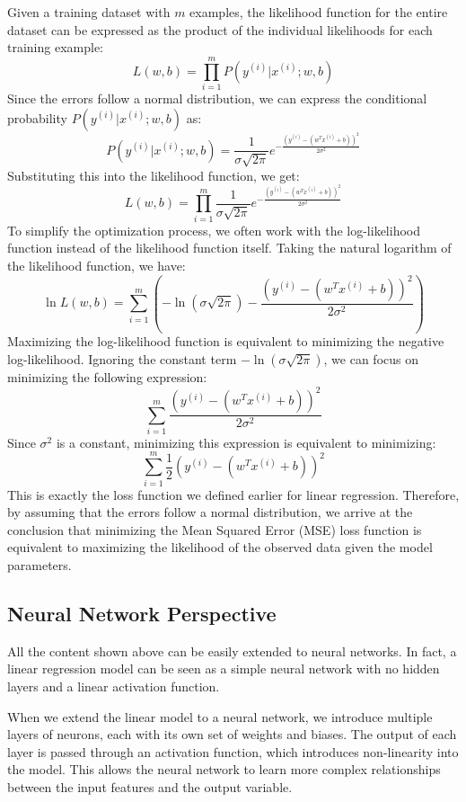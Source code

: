Given a training dataset with \(m\) examples, the likelihood function for the entire dataset can be expressed as the product of the individual likelihoods for each training example:
\[
L(w, b) = \prod_{i=1}^{m} P(y^{(i)} | x^{(i)}; w, b)
\]
Since the errors follow a normal distribution, we can express the conditional probability \(P(y^{(i)} | x^{(i)}; w, b)\) as:
\[
P(y^{(i)} | x^{(i)}; w, b) = \frac{1}{\sigma \sqrt{2\pi}} e^{-\frac{(y^{(i)} - (w^T x^{(i)} + b))^2}{2\sigma^2}}
\]
Substituting this into the likelihood function, we get:
\[
L(w, b) = \prod_{i=1}^{m} \frac{1}{\sigma \sqrt{2\pi}} e^{-\frac{(y^{(i)} - (w^T x^{(i)} + b))^2}{2\sigma^2}}
\]
To simplify the optimization process, we often work with the log-likelihood function instead of the likelihood function itself. Taking the natural logarithm of the likelihood function, we have:
\[
\ln L(w, b) = \sum_{i=1}^{m} \left( -\ln(\sigma \sqrt{2\pi}) - \frac{(y^{(i)} - (w^T x^{(i)} + b))^2}{2\sigma^2} \right)
\]
Maximizing the log-likelihood function is equivalent to minimizing the negative log-likelihood. Ignoring the constant term \(-\ln(\sigma \sqrt{2\pi})\), we can focus on minimizing the following expression:
\[
\sum_{i=1}^{m} \frac{(y^{(i)} - (w^T x^{(i)} + b))^2}{2\sigma^2}
\]
Since \(\sigma^2\) is a constant, minimizing this expression is equivalent to minimizing:
\[
\sum_{i=1}^{m} \frac{1}{2}(y^{(i)} - (w^T x^{(i)} + b))^2
\]
This is exactly the loss function we defined earlier for linear regression. Therefore, by assuming that the errors follow a normal distribution, we arrive at the conclusion that minimizing the Mean Squared Error (MSE) loss function is equivalent to maximizing the likelihood of the observed data given the model parameters.

\subsection{Neural Network Perspective}

All the content shown above can be easily extended to neural networks. In fact, a linear regression model can be seen as a simple neural network with no hidden layers and a linear activation function.

When we extend the linear model to a neural network, we introduce multiple layers of neurons, each with its own set of weights and biases. The output of each layer is passed through an activation function, which introduces non-linearity into the model. This allows the neural network to learn more complex relationships between the input features and the output variable.

